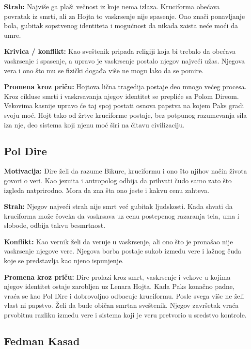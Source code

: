 \textbf{Strah:} Najviše ga plaši večnost iz koje nema izlaza. Kruciforma obećava povratak iz smrti, ali za Hojta to vaskrsenje nije spasenje. Ono znači ponavljanje bola, gubitak sopstvenog identiteta i mogućnost da nikada zaista neće moći da umre.

\textbf{Krivica / konflikt:} Kao sveštenik pripada religiji koja bi trebalo da obećava vaskrsenje i spasenje, a upravo je vaskrsenje postalo njegov najveći užas. Njegova vera i ono što mu se fizički događa više ne mogu lako da se pomire.

\textbf{Promena kroz priču:} Hojtova lična tragedija postaje deo mnogo većeg procesa. Kroz cikluse smrti i vaskrsavanja njegov identitet se prepliće sa Polom Direom. Vekovima kasnije upravo će taj spoj postati osnova papstva na kojem Paks gradi svoju moć. Hojt tako od žrtve kruciforme postaje, bez potpunog razumevanja sila iza nje, deo sistema koji njenu moć širi na čitavu civilizaciju.


\subsection*{Pol Dire}

\textbf{Motivacija:} Dire želi da razume Bikure, kruciformu i ono što njihov način života govori o veri. Kao jezuita i antropolog odbija da prihvati čudo samo zato što izgleda natprirodno. Mora da zna šta ono jeste i kakvu cenu zahteva.

\textbf{Strah:} Njegov najveći strah nije smrt već gubitak ljudskosti. Kada shvati da kruciforma može čoveka da vaskrsava uz cenu postepenog razaranja tela, uma i slobode, odbija takvu besmrtnost.

\textbf{Konflikt:} Kao vernik želi da veruje u vaskrsenje, ali ono što je pronašao nije vaskrsenje njegove vere. Njegova borba postaje sukob između vere i lažnog čuda koje se predstavlja kao njeno ispunjenje.

\textbf{Promena kroz priču:} Dire prolazi kroz smrt, vaskrsenje i vekove u kojima njegov identitet ostaje zarobljen uz Lenara Hojta. Kada Paks konačno padne, vraća se kao Pol Dire i dobrovoljno odbacuje kruciformu. Posle svega više ne želi vlast ni papstvo. Želi da bude običan smrtan sveštenik. Njegov završetak vraća prvobitnu razliku između vere i sistema koji je veru pretvorio u sredstvo kontrole.


\subsection*{Fedman Kasad}

